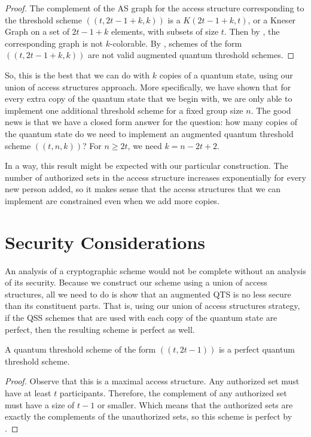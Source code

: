 \begin{proof}
    The complement of the AS graph for the access structure corresponding to the threshold scheme $((t,2t-1+k,k))$ is a $K(2t-1+k,t)$, or a Kneser Graph on a set of $2t-1+k$ elements, with subsets of size $t$. Then by , the corresponding graph is not $k$-colorable. By , schemes of the form $((t,2t-1+k,k))$ are not valid augmented quantum threshold schemes.
\end{proof}

So, this is the best that we can do with $k$ copies of a quantum state, using our union of access structures approach. More specifically, we have shown that for every extra copy of the quantum state that we begin with, we are only able to implement one additional threshold scheme for a fixed group size $n$. The good news is that we have a closed form answer for the question: how many copies of the quantum state do we need to implement an augmented quantum threshold scheme $((t,n,k))$? For $n \geq 2t$, we need $k = n - 2t + 2$.

In a way, this result might be expected with our particular construction. The number of authorized sets in the access structure increases exponentially for every new person added, so it makes sense that the access structures that we can implement are constrained even when we add more copies.

\section{Security Considerations}

An analysis of a cryptographic scheme would not be complete without an analysis of its security. Because we construct our scheme using a union of access structures, all we need to do is show that an augmented QTS is no less secure than its constituent parts. That is, using our union of access structures strategy, if the QSS schemes that are used with each copy of the quantum state are perfect, then the resulting scheme is perfect as well.

\begin{lemma}
    \label{lem:t-2t-1}
    A quantum threshold scheme of the form $((t,2t-1))$ is a perfect quantum threshold scheme.
\end{lemma}

\begin{proof}
    Observe that this is a maximal access structure. Any authorized set must have at least $t$ participants. Therefore, the complement of any authorized set must have a size of $t-1$ or smaller. Which means that the authorized sets are exactly the complements of the unauthorized sets, so this scheme is perfect by \cite{gottesman_theory_2000}.
\end{proof}

